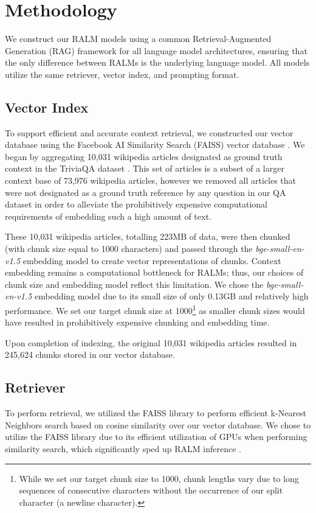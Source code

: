 \documentclass[11pt]{article}
\begin{document}
\section{Methodology}
We construct our RALM models using a common Retrieval-Augmented Generation (RAG) framework for all language model architectures, ensuring that the only difference between RALMs is the underlying language model. All models utilize the same retriever, vector index, and prompting format.
\subsection{Vector Index}
To support efficient and accurate context retrieval, we constructed our vector database using the Facebook AI Similarity Search (FAISS) vector database \cite{johnson2017billionscale}. 
We began by aggregating 10,031 wikipedia articles designated as ground truth context in the TriviaQA dataset \cite{Joshi2017TriviaQAAL}. This set of articles is a subset of a larger context base of 73,976 wikipedia articles, however we removed all articles that were not designated as a ground truth reference by any question in our QA dataset in order to alleviate the prohibitively expensive computational requirements of embedding such a high amount of text.

These 10,031 wikipedia articles, totalling 223MB of data, were then chunked (with chunk size equal to 1000 characters) and passed through the \textit{bge-small-en-v1.5} embedding model \cite{bge_embedding} to create vector representations of chunks. Context embedding remains a computational bottleneck for RALMs; thus, our choices of chunk size and embedding model reflect this limitation. We chose the \textit{bge-small-en-v1.5} embedding model due to its small size of only 0.13GB and relatively high performance. We set our target chunk size at 1000\footnote{While we set our target chunk size to 1000, chunk lengths vary due to long sequences of consecutive characters without the occurrence of our split character (a newline character).} as smaller chunk sizes would have resulted in prohibitively expensive chunking and embedding time.

Upon completion of indexing, the original 10,031 wikipedia articles resulted in 245,624 chunks stored in our vector database.
\subsection{Retriever}
To perform retrieval, we utilized the FAISS library to perform efficient k-Nearest Neighbors search based on cosine similarity over our vector database. We chose to utilize the FAISS library due to its efficient utilization of GPUs when performing similarity search, which significantly sped up RALM inference \cite{johnson2017billionscale}.
\end{document}
